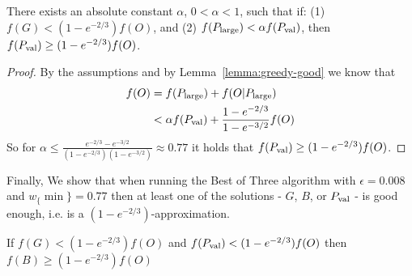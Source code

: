 \begin{lemma}
	\label{lemma:sub:alpha}
	There exists an absolute constant $\alpha$, $0 < \alpha < 1$, such that if: (1) $f(G) < (1 - e^{-2/3})f(O)$, and (2) $f(P_{\text{large}}) < \alpha f(P_{\text{val}})$, then $f(P_{\text{val}}) \geq (1 - e^{-2/3})f(O)$.
\end{lemma}

\begin{proof}
	By the assumptions and by Lemma~\ref{lemma:greedy-good} we know that 
	\begin{align}
		f(O)	& = f(P_{\text{large}}) + f(O|P_{\text{large}}) 
		\\ 		& < \alpha f(P_{\text{val}}) + \frac{1-e^{-2/3}}{1-e^{-3/2}}f(O)
	\end{align}
	So for $\alpha \leq \frac{e^{-2/3} - e^{-3/2}}{(1-e^{-2/3})(1-e^{-3/2})} \approx 0.77$ it holds that $f(P_{\text{val}}) \geq (1 - e^{-2/3})f(O)$.
\end{proof}

Finally, We show that when running the Best of Three algorithm with $\epsilon = 0.008$ and $w_\{\min\} = 0.77$ then at least one of the solutions - $G$, $B$, or $P_{\text{val}}$ - is good enough, i.e. is a $(1 - e^{-2/3})$-approximation.

\begin{theorem}
	\label{theorem:mmgreedy-or-bucket}
	If $f(G) < (1 - e^{-2/3})f(O)$ and $f(P_{\text{val}}) < (1 - e^{-2/3})f(O)$ then $f(B) \geq (1 - e^{-2/3})f(O)$
\end{theorem}

